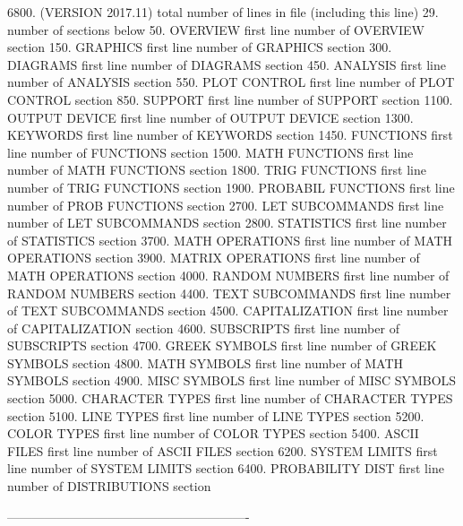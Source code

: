 6800.       (VERSION 2017.11)  total number of lines in file (including this line)
29.                          number of     sections below
   50.    OVERVIEW           first line number of OVERVIEW          section
  150.    GRAPHICS           first line number of GRAPHICS          section
  300.    DIAGRAMS           first line number of DIAGRAMS          section
  450.    ANALYSIS           first line number of ANALYSIS          section
  550.    PLOT CONTROL       first line number of PLOT CONTROL      section
  850.    SUPPORT            first line number of SUPPORT           section
 1100.    OUTPUT DEVICE      first line number of OUTPUT DEVICE     section
 1300.    KEYWORDS           first line number of KEYWORDS          section
 1450.    FUNCTIONS          first line number of FUNCTIONS         section
 1500.    MATH FUNCTIONS     first line number of MATH FUNCTIONS    section
 1800.    TRIG FUNCTIONS     first line number of TRIG FUNCTIONS    section
 1900.    PROBABIL FUNCTIONS first line number of PROB FUNCTIONS    section
 2700.    LET SUBCOMMANDS    first line number of LET SUBCOMMANDS   section
 2800.    STATISTICS         first line number of STATISTICS        section
 3700.    MATH OPERATIONS    first line number of MATH OPERATIONS   section
 3900.    MATRIX OPERATIONS  first line number of MATH OPERATIONS   section
 4000.    RANDOM NUMBERS     first line number of RANDOM NUMBERS    section
 4400.    TEXT SUBCOMMANDS   first line number of TEXT SUBCOMMANDS  section
 4500.    CAPITALIZATION     first line number of CAPITALIZATION    section
 4600.    SUBSCRIPTS         first line number of SUBSCRIPTS        section
 4700.    GREEK SYMBOLS      first line number of GREEK SYMBOLS     section
 4800.    MATH SYMBOLS       first line number of MATH SYMBOLS      section
 4900.    MISC SYMBOLS       first line number of MISC SYMBOLS      section
 5000.    CHARACTER TYPES    first line number of CHARACTER TYPES   section
 5100.    LINE TYPES         first line number of LINE TYPES        section
 5200.    COLOR TYPES        first line number of COLOR TYPES       section
 5400.    ASCII FILES        first line number of ASCII FILES       section
 6200.    SYSTEM LIMITS      first line number of SYSTEM LIMITS     section
 6400.    PROBABILITY DIST   first line number of DISTRIBUTIONS     section
 
----------------------------------------------------------

















